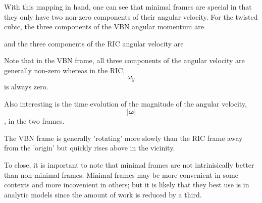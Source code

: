 \documentclass[10pt]{article}
\begin{document}
With this mapping in hand, one can see that minimal frames are special in that they only have two non-zero components of their angular velocity.  For the twisted cubic, the three components of the VBN angular momentum are

and the three components of the RIC angular velocity are


Note that in the VBN frame, all three components of the angular velocity are generally non-zero whereas in the RIC, $$\omega_y$$ is always zero.

Also interesting is the time evolution of the magnitude of the angular velocity, $$|\mathbf{\omega}|$$, in the two frames.


The VBN frame is generally 'rotating' more slowly than the RIC frame away from the 'origin' but quickly rises above in the vicinity.  

To close, it is important to note that minimal frames are not intrinisically better than non-minimal frames.  Minimal frames may be more convenient in some contexts and more incovenient in others; but it is likely that they best use is in analytic models since the amount of work is reduced by a third. 
\end{document}
